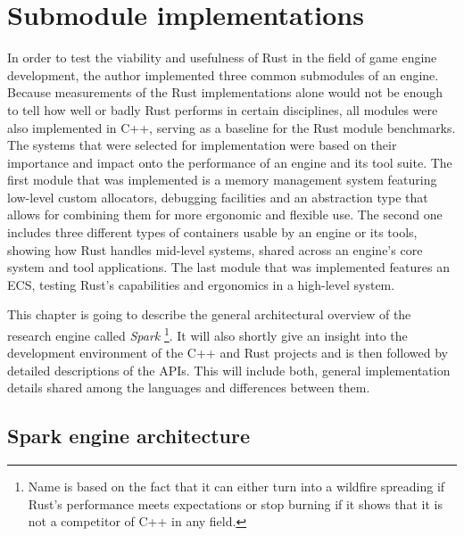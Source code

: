 \chapter{Submodule implementations}

In order to test the viability and usefulness of Rust in the field of game engine development, the author implemented three common submodules of an engine. Because measurements of the Rust implementations alone would not be enough to tell how well or badly Rust performs in certain disciplines, all modules were also implemented in C++, serving as a baseline for the Rust module benchmarks. The systems that were selected for implementation were based on their importance and impact onto the performance of an engine and its tool suite. The first module that was implemented is a memory management system featuring low-level custom allocators, debugging facilities and an abstraction type that allows for combining them for more ergonomic and flexible use. The second one includes three different types of containers usable by an engine or its tools, showing how Rust handles mid-level systems, shared across an engine's core system and tool applications. The last module that was implemented features an \ac{ECS}, testing Rust's capabilities and ergonomics in a high-level system. 

This chapter is going to describe the general architectural overview of the research engine called \textit{Spark} \footnote{Name is based on the fact that it can either turn into a wildfire spreading if Rust's performance meets expectations or stop burning if it shows that it is not a competitor of C++ in any field.}. It will also shortly give an insight into the development environment of the C++ and Rust projects and is then followed by detailed descriptions of the \acp{API}. This will include both, general implementation details shared among the languages and differences between them.

\section{Spark engine architecture}

